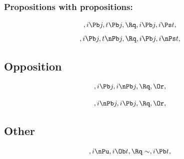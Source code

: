\bigskip
\bigskip
\bigskip
\bigskip
\subsubsection{Propositions with propositions:}
\[,i \Pb j, t \Pb j, \Rq , i \Pb j, i \Ps t,\]
\[,i \Pb j, t \nPb j, \Rq , i \Pb j, i \nPs t,\]




\bigskip
\bigskip
\bigskip
\bigskip
\subsection{ Opposition}
\[,i \Pb j, i \nPb j, \Rq , \Or,\]


\[,i \nPb j, i \Pb j, \Rq , \Or,\]




\bigskip
\bigskip
\subsection{Other}

\[, i \nPu, i \Ob t, \Rq \sim, i \Pb t,\]

